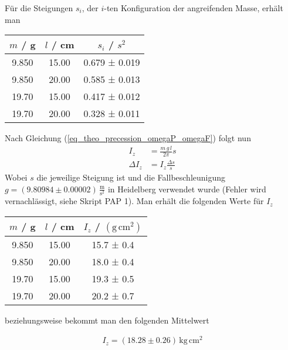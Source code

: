 \documentclass[12pt,a4paper,german]{scrartcl}
\numberwithin{equation}{section}
\begin{document}
  Für die Steigungen $s_i$, der $i$-ten Konfiguration der angreifenden Masse, erhält man
  
  \begin{center}
    \begin{tabular}{c | c | c}
      $m$ / g & $l$ / cm & $s_i$ / $s^2$ \\
      \hline
      9.850 & 15.00 & 0.679 ± 0.019 \\
      9.850 & 20.00 & 0.585 ± 0.013 \\
      19.70 & 15.00 & 0.417 ± 0.012 \\
      19.70 & 20.00 & 0.328 ± 0.011 
    \end{tabular}
    \label{table_I_z_slopes}
  \end{center}

  Nach Gleichung (\ref{eq_theo_precession_omegaP_omegaF}) folgt nun
  \begin{align}
    I_z &= \frac{m \, g \, l}{2 \pi} s \nonumber \\
    \Delta I_z &= I_z \frac{\Delta s}{s}
    \label{eq_I_z}
  \end{align}
  Wobei $s$ die jeweilige Steigung ist und die Fallbeschleunigung $g = (9.80984 \pm 0.00002) \, \frac{\text{m}}{\text{s}^2}$ in Heidelberg verwendet wurde (Fehler wird vernachlässigt, siehe Skript PAP 1). Man erhält die folgenden Werte für $I_z$

  \begin{center}
    \begin{tabular}{c | c | c}
      $m$ / g & $l$ / cm & $I_z$ / $(\text{g} \, \text{cm}^2)$ \\
      \hline
      9.850 & 15.00 & 15.7 ± 0.4 \\
      9.850 & 20.00 & 18.0 ± 0.4 \\
      19.70 & 15.00 & 19.3 ± 0.5 \\
      19.70 & 20.00 & 20.2 ± 0.7
    \end{tabular}
    \label{table_I_z}
  \end{center}

  beziehungsweise bekommt man den folgenden Mittelwert

  \begin{align}
    I_z = (18.28 \pm 0.26) \, \text{kg} \, \text{cm}^2
  \end{align}
\end{document}
